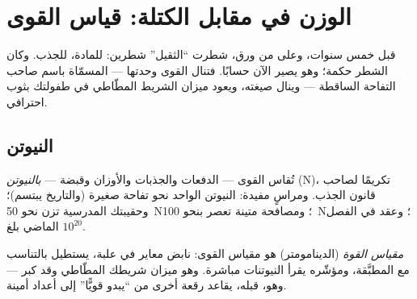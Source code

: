 \chapter{الوزن في مقابل الكتلة: قياس القوى}\label{ch:g9:weight-vs-mass}

قبل خمس سنوات، وعلى  من ورق، شطرت ``الثقيل'' شطرين: 
للمادة،  للجذب. وكان الشطر حكمة؛ وهو يصير الآن حسابًا.
فتنال القوى وحدتها --- المسمّاة باسم صاحب التفاحة الساقطة ---
وينال  صيغته، ويعود ميزان الشريط المطّاطي في طفولتك بثوب
احترافي.

\section{النيوتن}

\begin{definition}[النيوتن]\label{def:g9:weight-vs-mass:newton}
تُقاس القوى --- الدفعات والجذبات والأوزان وقبضة  ---
\emph{بالنيوتن} (\unit{N})، تكريمًا لصاحب قانون
الجذب. ومراسٍ مفيدة: النيوتن الواحد نحو  تفاحة صغيرة
(والتاريخ يبتسم)؛ وحقيبتك المدرسية تزن نحو \qty{50}{N}؛ ومصافحة
متينة تعصر بنحو \qty{100}{N}؛ وعقد  في الفصل الماضي بلغ
$10^{20}$.
\end{definition}

\begin{definition}\label{def:g9:weight-vs-mass:dynamometer}
\emph{مقياس القوة} (الدينامومتر) هو مقياس
القوى: نابض معاير في علبة، يستطيل بالتناسب مع  المطبَّقة،
ومؤشّره يقرأ النيوتنات مباشرة. وهو ميزان شريطك المطّاطي وقد
كبر --- وهو،   قبله، يقاعد رقعة أخرى
من ``يبدو قويًّا'' إلى أعداد أمينة.
\end{definition}

